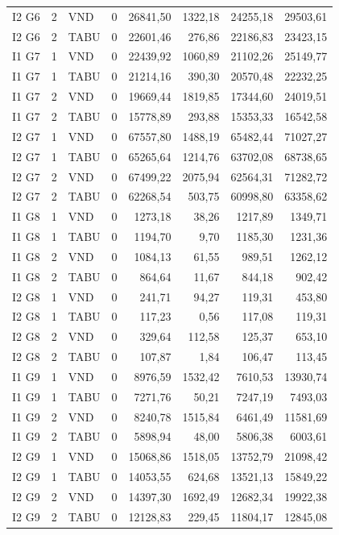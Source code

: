 \begin{longtable}{lrlrrrrr}
I2 G6 & 2 & VND & 0 & 26841,50 & 1322,18 & 24255,18 & 29503,61 \\
I2 G6 & 2 & TABU & 0 & 22601,46 & 276,86 & 22186,83 & 23423,15 \\
I1 G7 & 1 & VND & 0 & 22439,92 & 1060,89 & 21102,26 & 25149,77 \\
I1 G7 & 1 & TABU & 0 & 21214,16 & 390,30 & 20570,48 & 22232,25 \\
I1 G7 & 2 & VND & 0 & 19669,44 & 1819,85 & 17344,60 & 24019,51 \\
I1 G7 & 2 & TABU & 0 & 15778,89 & 293,88 & 15353,33 & 16542,58 \\
I2 G7 & 1 & VND & 0 & 67557,80 & 1488,19 & 65482,44 & 71027,27 \\
I2 G7 & 1 & TABU & 0 & 65265,64 & 1214,76 & 63702,08 & 68738,65 \\
I2 G7 & 2 & VND & 0 & 67499,22 & 2075,94 & 62564,31 & 71282,72 \\
I2 G7 & 2 & TABU & 0 & 62268,54 & 503,75 & 60998,80 & 63358,62 \\
I1 G8 & 1 & VND & 0 & 1273,18 & 38,26 & 1217,89 & 1349,71 \\
I1 G8 & 1 & TABU & 0 & 1194,70 & 9,70 & 1185,30 & 1231,36 \\
I1 G8 & 2 & VND & 0 & 1084,13 & 61,55 & 989,51 & 1262,12 \\
I1 G8 & 2 & TABU & 0 & 864,64 & 11,67 & 844,18 & 902,42 \\
I2 G8 & 1 & VND & 0 & 241,71 & 94,27 & 119,31 & 453,80 \\
I2 G8 & 1 & TABU & 0 & 117,23 & 0,56 & 117,08 & 119,31 \\
I2 G8 & 2 & VND & 0 & 329,64 & 112,58 & 125,37 & 653,10 \\
I2 G8 & 2 & TABU & 0 & 107,87 & 1,84 & 106,47 & 113,45 \\
I1 G9 & 1 & VND & 0 & 8976,59 & 1532,42 & 7610,53 & 13930,74 \\
I1 G9 & 1 & TABU & 0 & 7271,76 & 50,21 & 7247,19 & 7493,03 \\
I1 G9 & 2 & VND & 0 & 8240,78 & 1515,84 & 6461,49 & 11581,69 \\
I1 G9 & 2 & TABU & 0 & 5898,94 & 48,00 & 5806,38 & 6003,61 \\
I2 G9 & 1 & VND & 0 & 15068,86 & 1518,05 & 13752,79 & 21098,42 \\
I2 G9 & 1 & TABU & 0 & 14053,55 & 624,68 & 13521,13 & 15849,22 \\
I2 G9 & 2 & VND & 0 & 14397,30 & 1692,49 & 12682,34 & 19922,38 \\
I2 G9 & 2 & TABU & 0 & 12128,83 & 229,45 & 11804,17 & 12845,08 \\

\end{longtable}
